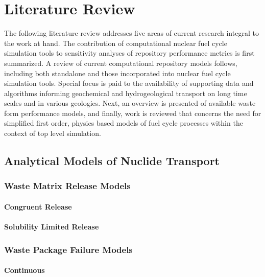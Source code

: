 \chapter{Literature Review}\label{chap:litrev}
The following literature review addresses five areas of current 
research integral to the work at hand. The contribution of 
computational nuclear fuel cycle simulation tools to sensitivity 
analyses of repository performance metrics is first summarized. A 
review of current computational repository models follows, including 
both standalone and those incorporated into nuclear fuel cycle 
simulation tools. Special focus is paid to the availability of 
supporting data and algorithms informing geochemical and 
hydrogeological transport on long time scales and in various 
geologies. Next, an overview is presented of available waste form 
performance models, and finally, work is reviewed that concerns the 
need for simplified first order, physics based models of fuel cycle 
processes within the context of top level simulation.  




\section{Analytical Models of Nuclide 
Transport}\label{sec:analytical_nuc}



\subsection{Waste Matrix Release Models}

\subsubsection{Congruent Release}

\subsubsection{Solubility Limited Release}



\subsection{Waste Package Failure Models}

\subsubsection{Continuous}

